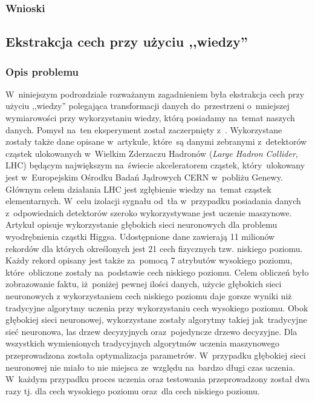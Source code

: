 \subsubsection{Wnioski}

\subsection{Ekstrakcja cech przy użyciu ,,wiedzy''}
\subsubsection{Opis problemu}
W~niniejszym podrozdziale rozważanym zagadnieniem była ekstrakcja cech przy użyciu ,,wiedzy'' polegająca transformacji danych do~przestrzeni o~mniejszej wymiarowości przy wykorzystaniu wiedzy, którą posiadamy na~temat naszych danych. Pomysł na~ten eksperyment został zaczerpnięty z~\cite{higgs1}. Wykorzystane zostały także dane opisane w~artykule, które~są danymi zebranymi z~detektorów cząstek ulokowanych w~Wielkim Zderzaczu Hadronów (\textit{Large Hadron Collider}, LHC) będącym największym na~świecie akceleratorem cząstek, który~ulokowany jest w~Europejskim Ośrodku Badań Jądrowych CERN w~pobliżu Genewy. Głównym celem działania LHC jest zgłębienie wiedzy na~temat cząstek elementarnych. W~celu izolacji sygnału od~tła w~przypadku posiadania danych z~odpowiednich detektorów szeroko wykorzystywane jest uczenie maszynowe. Artykuł opisuje wykorzystanie głębokich sieci neuronowych dla problemu wyodrębnienia cząstki Higgsa. Udostępnione dane zawierają 11 milionów rekordów dla których określonych jest 21 cech fizycznych tzw. niskiego poziomu. Każdy rekord opisany jest także za~pomocą 7 atrybutów wysokiego poziomu, które~obliczone zostały na~podstawie cech niskiego poziomu. Celem obliczeń było zobrazowanie faktu, iż~poniżej pewnej ilości danych, użycie głębokich sieci neuronowych z wykorzystaniem cech niskiego poziomu daje gorsze wyniki niż tradycyjne algorytmy uczenia przy wykorzystaniu cech wysokiego poziomu. Obok głębokiej sieci neuronowej, wykorzystane zostały algorytmy takiej jak~tradycyjne sieć neuronowa, las drzew decyzyjnych oraz~pojedyncze drzewo decyzyjne. Dla wszystkich wymienionych tradycyjnych algorytmów uczenia maszynowego przeprowadzona została optymalizacja parametrów. W~przypadku głębokiej sieci neuronowej nie miało to nie miejsca ze~względu na~bardzo długi czas uczenia. W~każdym przypadku proces uczenia oraz testowania przeprowadzony został dwa razy tj. dla cech wysokiego poziomu oraz~dla cech niskiego poziomu.

